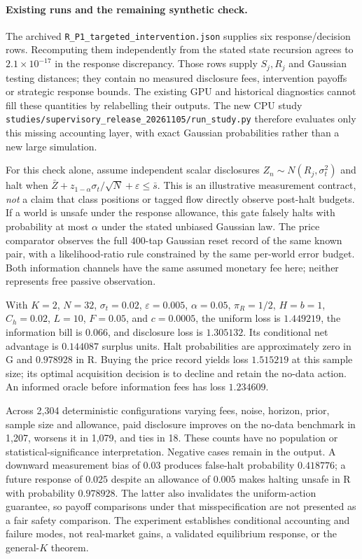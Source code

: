 \paragraph{Existing runs and the remaining synthetic check.} The archived \nolinkurl{R_P1_targeted_intervention.json} supplies six response/decision rows. Recomputing them independently from the stated state recursion agrees to $2.1\times10^{-17}$ in the response discrepancy. Those rows supply $S_j,R_j$ and Gaussian testing distances; they contain no measured disclosure fees, intervention payoffs or strategic response bounds. The existing GPU and historical diagnostics cannot fill these quantities by relabelling their outputs. The new CPU study \nolinkurl{studies/supervisory_release_20261105/run_study.py} therefore evaluates only this missing accounting layer, with exact Gaussian probabilities rather than a new large simulation.

For this check alone, assume independent scalar disclosures $Z_n\sim N(R_j,\sigma_t^2)$ and halt when $\bar Z+z_{1-\alpha}\sigma_t/\sqrt N+\varepsilon\le\bar s$. This is an illustrative measurement contract, \emph{not} a claim that class positions or tagged flow directly observe post-halt budgets. If a world is unsafe under the response allowance, this gate falsely halts with probability at most $\alpha$ under the stated unbiased Gaussian law. The price comparator observes the full 400-tap Gaussian reset record of the same known pair, with a likelihood-ratio rule constrained by the same per-world error budget. Both information channels have the same assumed monetary fee here; neither represents free passive observation.

With $K=2$, $N=32$, $\sigma_t=0.02$, $\varepsilon=0.005$, $\alpha=0.05$, $\pi_R=1/2$, $H=b=1$, $C_h=0.02$, $L=10$, $F=0.05$, and $c=0.0005$, the uniform loss is $1.449219$, the information bill is $0.066$, and disclosure loss is $1.305132$. Its conditional net advantage is $0.144087$ surplus units. Halt probabilities are approximately zero in G and $0.978928$ in R. Buying the price record yields loss $1.515219$ at this sample size; its optimal acquisition decision is to decline and retain the no-data action. An informed oracle before information fees has loss $1.234609$.

Across 2,304 deterministic configurations varying fees, noise, horizon, prior, sample size and allowance, paid disclosure improves on the no-data benchmark in 1,207, worsens it in 1,079, and ties in 18. These counts have no population or statistical-significance interpretation. Negative cases remain in the output. A downward measurement bias of $0.03$ produces false-halt probability $0.418776$; a future response of $0.025$ despite an allowance of $0.005$ makes halting unsafe in R with probability $0.978928$. The latter also invalidates the uniform-action guarantee, so payoff comparisons under that misspecification are not presented as a fair safety comparison. The experiment establishes conditional accounting and failure modes, not real-market gains, a validated equilibrium response, or the general-$K$ theorem.

